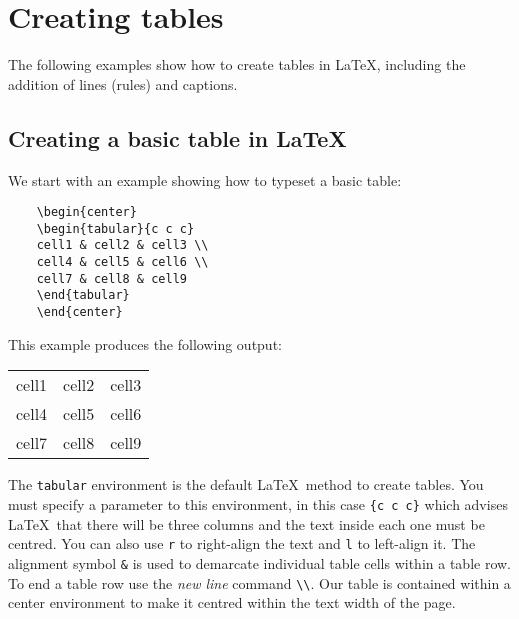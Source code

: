 \section{Creating tables}

The following examples show how to create tables in LaTeX, including the addition of lines (rules) and captions.

\subsection{Creating a basic table in \LaTeX}

We start with an example showing how to typeset a basic table:

\begin{tcolorbox}
\begin{verbatim}
    \begin{center}
    \begin{tabular}{c c c}
    cell1 & cell2 & cell3 \\ 
    cell4 & cell5 & cell6 \\  
    cell7 & cell8 & cell9    
    \end{tabular}
    \end{center}
\end{verbatim}
\end{tcolorbox}

This example produces the following output:

\begin{mdframed}
    \begin{center}
    \begin{tabular}{c c c}
    cell1 & cell2 & cell3 \\ 
    cell4 & cell5 & cell6 \\  
    cell7 & cell8 & cell9    
    \end{tabular}
    \end{center}
\end{mdframed}

The \verb|tabular| environment is the default \LaTeX\ method to create tables. You must specify a parameter to this environment, in this case \verb|{c c c}| which advises \LaTeX\ that there will be three columns and the text inside each one must be centred. You can also use \verb|r| to right-align the text and \verb|l| to left-align it. The alignment symbol \verb|&| is used to demarcate individual table cells within a table row. To end a table row use the \emph{new line} command \verb|\\|. Our table is contained within a center environment to make it centred within the text width of the page.

